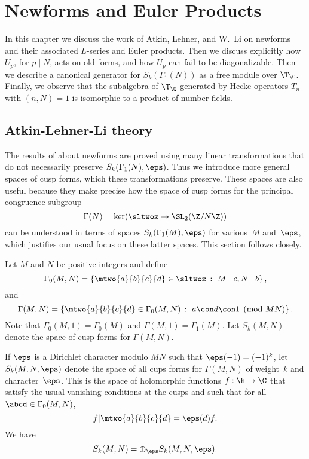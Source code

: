 \documentclass{report}
\begin{document}

\chapter{Newforms and Euler Products}

In this chapter we discuss the work of Atkin, Lehner, and W.~Li on
newforms and their associated $L$-series and Euler products.  Then we
discuss explicitly how $U_p$, for $p\mid N$, acts on old forms, and
how $U_p$ can fail to be diagonalizable.  Then we describe a canonical
generator for $S_k(\Gamma_1(N))$ as a free module over $\T_\C$.
Finally, we observe that the subalgebra of $\T_\Q$ generated by Hecke
operators $T_n$ with $(n,N)=1$ is isomorphic to a product of number
fields.


\section{Atkin-Lehner-Li theory}\label{sec:atkin}
The results of \cite{winnie:newforms} about newforms are proved
using many linear transformations that do not necessarily preserve
$S_k(\Gamma_1(N),\eps)$.   Thus we introduce more general spaces of
cusp forms, which these transformations preserve.
These spaces are also useful because they make precise how the
space of cusp forms for the principal congruence subgroup
$$
  \Gamma(N) = \ker(\sltwoz\to \SL_2(\Z/N\Z))
$$
can be understood in terms of spaces $S_k(\Gamma_1(M),\eps)$ for
various~$M$ and~$\eps$, which justifies our usual focus on these
latter spaces.  This section follows \cite{winnie:newforms}
closely.

Let $M$ and $N$ be positive integers and define
\[
\Gamma_0(M,N) = \left\{ \mtwo{a}{b}{c}{d} \in\sltwoz \,:\,\, M\mid
c, N\mid b\right\},
\]
and
\[
\Gamma(M,N) = \left\{ \mtwo{a}{b}{c}{d}\in\Gamma_0(M,N) \,:\,\, a
\con d\con 1\pmod{MN}\right\}.
\]
Note that $\Gamma_0(M,1) = \Gamma_0(M)$ and $\Gamma(M,1)=
\Gamma_1(M)$.  Let $S_k(M,N)$ denote the space of cusp forms for
$\Gamma(M,N)$.

If $\eps$ is a Dirichlet character modulo $MN$ such that
$\eps(-1)=(-1)^k$, let $S_k(M,N, \eps)$ denote the space of all
cups forms for $\Gamma(M,N)$ of weight~$k$ and character~$\eps$.
This is the space of holomorphic functions $f:\h\to \C$ that
satisfy the usual vanishing conditions at the cusps and such that
for all $\abcd\in\Gamma_0(M,N)$,
\[
  f|\mtwo{a}{b}{c}{d} = \eps(d) f.
\]
 We have
\[
   S_k(M,N) = \oplus_{\eps} S_k(M,N,\eps).
\]
\end{document}
